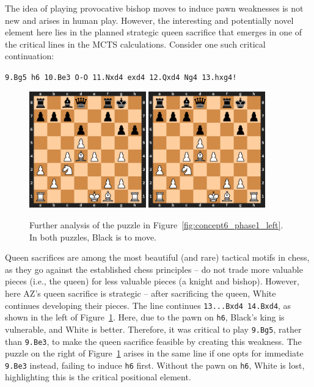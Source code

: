 \documentclass{article}
\newcommand{\ct}[1]{\texttt{#1}}
\begin{document}
The idea of playing provocative bishop moves to induce pawn weaknesses is not new and arises in human play. However, the interesting and potentially novel element here lies in the planned strategic queen sacrifice that emerges in one of the critical lines in the MCTS calculations.
Consider one such critical continuation: 
\begin{displayquote}
\ct{9.Bg5 h6 10.Be3 O-O 11.Nxd4 exd4 12.Qxd4 Ng4 13.hxg4!}
\end{displayquote}

\begin{figure}[!ht]
\caption{Further analysis of the puzzle in Figure~\ref{fig:concept6_phase1_left}. In both puzzles, Black is to move.}
\centering
\includegraphics[width=0.45\textwidth]{chess_positions/bg5_followup1.png}
\hspace{0.02\textwidth}
\includegraphics[width=0.45\textwidth]{chess_positions/bg5_followup2.png}
\hspace{0.02\textwidth}
\label{fig:digging_deeper_ex2}
\end{figure}

Queen sacrifices are among the most beautiful (and rare) tactical motifs in chess, as they go against the established chess principles --  do not trade more valuable pieces (i.e., the queen) for less valuable pieces (a knight and bishop).
However, here AZ's queen sacrifice is strategic -- after sacrificing the queen, White continues developing their pieces.
The line continues \ct{13...Bxd4 14.Bxd4}, as shown in the left of Figure~\ref{fig:digging_deeper_ex2}. Here, due to the pawn on \ct{h6}, Black's king is vulnerable, and White is better. 
Therefore, it was critical to play \ct{9.Bg5}, rather than \ct{9.Be3}, to make the queen sacrifice feasible by creating this weakness. The puzzle on the right of Figure~\ref{fig:digging_deeper_ex2} arises in the same line if one opts for immediate \ct{9.Be3} instead, failing to induce \ct{h6} first. Without the pawn on \ct{h6}, White is lost, highlighting this is the critical positional element. 
\end{document}
